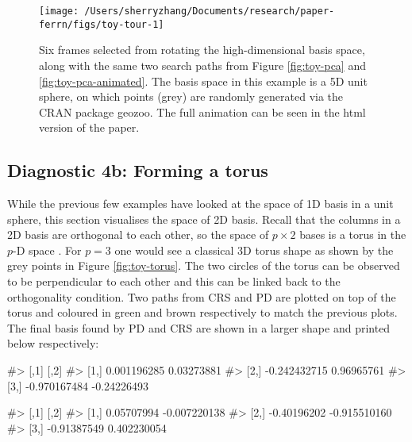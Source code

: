 \begin{Schunk}
\begin{figure}

{\centering \texttt{[image: /Users/sherryzhang/Documents/research/paper-ferrn/figs/toy-tour-1]} 

}

\caption{Six frames selected from rotating the high-dimensional basis space, along with the same two search paths from Figure \ref{fig:toy-pca} and \ref{fig:toy-pca-animated}. The basis space in this example is a 5D unit sphere, on which points (grey) are randomly generated via the CRAN package geozoo. The full animation can be seen in the html version of the paper.}\label{fig:toy-tour}
\end{figure}
\end{Schunk}

\hypertarget{diagnostic-4b-forming-a-torus}{%
\subsection{Diagnostic 4b: Forming a
torus}\label{diagnostic-4b-forming-a-torus}}

While the previous few examples have looked at the space of 1D basis in
a unit sphere, this section visualises the space of 2D basis. Recall
that the columns in a 2D basis are orthogonal to each other, so the
space of \(p \times 2\) bases is a torus in the \(p\)-D space
\citep{Buja1986-sw}. For \(p = 3\) one would see a classical 3D torus
shape as shown by the grey points in Figure \ref{fig:toy-torus}. The two
circles of the torus can be observed to be perpendicular to each other
and this can be linked back to the orthogonality condition. Two paths
from CRS and PD are plotted on top of the torus and coloured in green
and brown respectively to match the previous plots. The final basis
found by PD and CRS are shown in a larger shape and printed below
respectively:

\begin{Schunk}
\begin{Soutput}
#>              [,1]        [,2]
#> [1,]  0.001196285  0.03273881
#> [2,] -0.242432715  0.96965761
#> [3,] -0.970167484 -0.24226493
\end{Soutput}
\end{Schunk}

\begin{Schunk}
\begin{Soutput}
#>             [,1]         [,2]
#> [1,]  0.05707994 -0.007220138
#> [2,] -0.40196202 -0.915510160
#> [3,] -0.91387549  0.402230054
\end{Soutput}
\end{Schunk}

